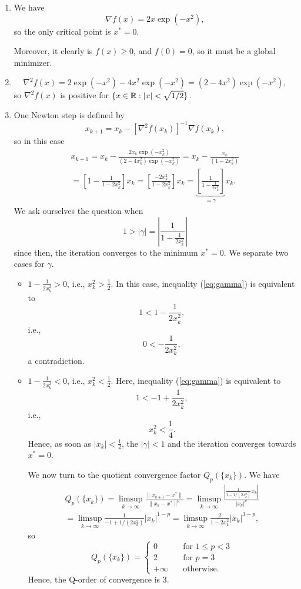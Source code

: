\begin{enumerate}

\item We have
\[
\nabla f(x) = 2x\exp(-x^2),
\]
so the only critical point is $x^*=0$.

Moreover, it clearly is $f(x)\ge 0$, and $f(0) = 0$, so it must be a global
minimizer.

\item
\[
\nabla^2 f(x) = 2\exp(-x^2) - 4x^2\exp(-x^2) = (2-4x^2)\exp(-x^2),
\]
so $\nabla^2 f(x)$ is positive for $\{x\in\mathbb{R}: |x|<\sqrt{1/2}\}$.

\item One Newton step is defined by
\[
x_{k+1} = x_k - [\nabla^2 f(x_k)]^{-1} \nabla f(x_k),
\]
so in this case
\begin{multline*}
x_{k+1}
= x_k - \frac{2x_k\exp(-x_k^2)}{(2-4x_k^2)\exp(-x_k^2)}
= x_k - \frac{x_k}{(1-2x_k^2)}\\
= \left[1 - \frac{1}{1-2x_k^2}\right] x_k
= \left[\frac{-2x_k^2}{1-2x_k^2}\right] x_k
= \underbrace{\left[\frac{1}{1-\frac{1}{2x_k^2}}\right]}_{=\gamma} x_k.
\end{multline*}
We ask ourselves the question when
\begin{equation}\label{eq:gamma}
1 > |\gamma| = \left|\frac{1}{1-\frac{1}{2x_k^2}}\right|
\end{equation}
since then, the iteration converges to the minimum $x^*=0$.
We separate two cases for $\gamma$.
\begin{itemize}
\item $1-\frac{1}{2x_k^2} > 0$, i.e., $x_k^2 > \frac{1}{2}$.
      In this case, inequality (\ref{eq:gamma}) is equivalent to
\[
1 < 1 - \frac{1}{2x_k^2},
\]
i.e.,
\[
0 < - \frac{1}{2x_k^2},
\]
a contradiction.

\item $1-\frac{1}{2x_k^2} < 0$, i.e., $x_k^2 < \frac{1}{2}$.
      Here, inequality (\ref{eq:gamma}) is equivalent to
\[
1 < -1 + \frac{1}{2x_k^2},
\]
i.e.,
\[
x_k^2 < \frac{1}{4}.
\]
Hence, as soon as $|x_k| < \frac{1}{2}$, the $|\gamma| < 1$ and the iteration
converges towards $x^*=0$.

We now turn to the quotient convergence factor $Q_p(\{x_k\})$. We have
\begin{multline*}
Q_p(\{x_k\})
= \limsup_{k\to\infty} \frac{\|x_{k+1}-x^*\|}{\|x_k-x^*\|^p}
= \limsup_{k\to\infty} \frac{\left|\frac{1}{1-1/(2x_k^2)} x_k\right|}{|x_k|^p}\\
= \limsup_{k\to\infty} \frac{1}{-1+1/(2x_k^2)} |x_k|^{1-p}
= \limsup_{k\to\infty} \frac{2}{1-2x_k^2} |x_k|^{3-p},
\end{multline*}
so
\[
Q_p(\{x_k\}) =
\begin{cases}
0 \quad&\text{for } 1\le p < 3\\
2 \quad&\text{for }  p = 3\\
+\infty \quad&\text{otherwise.}
\end{cases}
\]
Hence, the Q-order of convergence is 3.
\end{itemize}


\end{enumerate}
